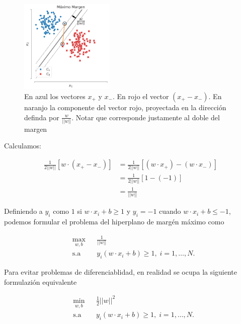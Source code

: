 \begin{figure}[ht]
    \centering
    \includegraphics[width=0.4\textwidth]{img/cap5_max_margen2.pdf}
    \caption{En azul los vectores $x_+$ y $x_{-}$. En rojo el vector $(x_+ - x_{-})$. En naranjo la componente del vector rojo, proyectada en la dirección definda por $\frac{w}{||w||}$. Notar que corresponde justamente al doble del margen}
    \label{fig:my_label2}
\end{figure}

Calculamos:

\begin{align*}
    \frac{1}{2||w||}[ w \cdot (x_{+} - x_{-})] &= \frac{1}{2||w||} [ (w\cdot x_{+}) - (w\cdot x_{-})]\\
    &= \frac{1}{2||w||} [1 - (-1)]\\
    &= \frac{1}{||w||}
\end{align*}

Definiendo a $y_i$ como $1$ si $w\cdot x_i + b \geq1$ y $y_i =-1$ cuando  $w\cdot x_i + b \leq -1$, podemos formular el problema del hiperplano de margén máximo como

\begin{equation*}
\begin{aligned}
& \underset{w,b}{\text{max}}
& & \frac{1}{||w||}\\
& \text{s.a}
& & y_i (w\cdot x_i +b) \geq 1, \; i = 1, \ldots, N.
\end{aligned}
\end{equation*}

Para evitar problemas de diferenciablidad, en realidad se ocupa la siguiente formulazión equivalente

\begin{equation*}
\begin{aligned}
& \underset{w,b}{\text{min}}
& & \frac{1}{2}||w||^2\\
& \text{s.a}
& & y_i (w\cdot x_i +b) \geq 1, \; i = 1, \ldots, N.
\end{aligned}
\end{equation*}

